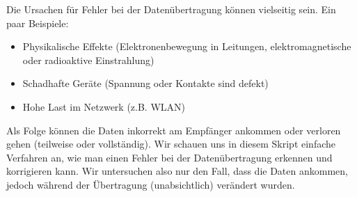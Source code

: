 Die Ursachen für Fehler bei der Datenübertragung können vielseitig sein. Ein paar Beispiele:

\begin{itemize}
\item Physikalische Effekte (Elektronenbewegung in Leitungen, elektromagnetische oder radioaktive Einstrahlung)
\item Schadhafte Geräte (Spannung oder Kontakte sind defekt)
\item Hohe Last im Netzwerk (z.B. \ac{WLAN})
\end{itemize}

Als Folge können die Daten inkorrekt am Empfänger ankommen oder verloren gehen (teilweise oder vollständig). Wir schauen uns in diesem Skript einfache Verfahren an, wie man einen Fehler bei der Datenübertragung erkennen und korrigieren kann. Wir untersuchen also nur den Fall, dass die Daten ankommen, jedoch während der Übertragung (unabsichtlich) verändert wurden. 